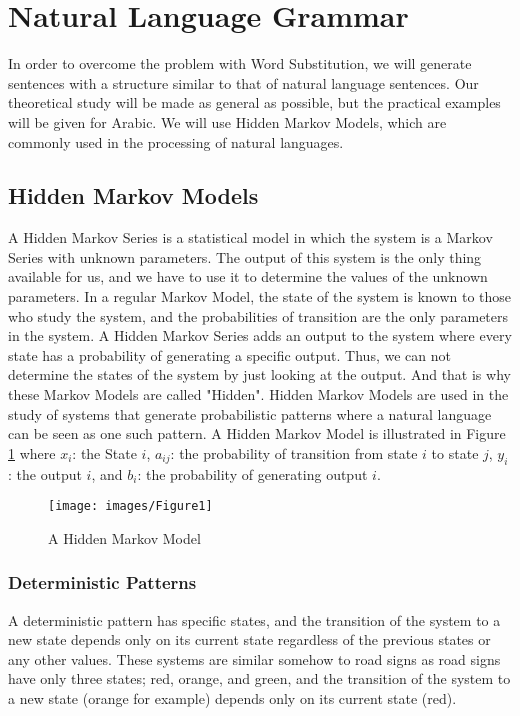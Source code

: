\documentclass{acm_proc_article-sp}
\begin{document}
\section{Natural Language Grammar}\label{Natural-Language-Grammar}
In order to overcome the problem with Word Substitution, we will generate sentences with a structure similar to that of natural language sentences. Our theoretical study will be made as general as possible, but the practical examples will be given for Arabic. We will use Hidden Markov Models, which are commonly used in the processing of natural languages.

\subsection{Hidden Markov Models}\label{Hidden-Markov-Models}
A Hidden Markov Series \cite{Rabiner1990} is a statistical model in which the system is a Markov Series with unknown parameters. The output of this system is the only thing available for us, and we have to use it to determine the values of the unknown parameters. In a regular Markov Model, the state of the system is known to those who study the system, and the probabilities of transition are the only parameters in the system. A Hidden Markov Series adds an output to the system where every state has a probability of generating a specific output. Thus, we can not determine the states of the system by just looking at the output. And that is why these Markov Models are called "Hidden". Hidden Markov Models are used in the study of systems that generate probabilistic patterns where a natural language can be seen as one such pattern. A Hidden Markov Model is illustrated in Figure \ref{A-Hidden-Markov-Model} where $x_{i}$: the State $i$, $a_{ij}$: the probability of transition from state $i$ to state $j$, $y_{i}$: the output $i$, and $b_{i}$: the probability of generating output $i$.

\begin{figure}
  \centering
  \texttt{[image: images/Figure1]}
  \caption{A Hidden Markov Model}\label{A-Hidden-Markov-Model}
\end{figure}

\subsubsection{Deterministic Patterns}\label{Deterministic-Patterns}
A deterministic pattern has specific states, and the transition of the system to a new state depends only on its current state regardless of the previous states or any other values. These systems are similar somehow to road signs as road signs have only three states; red, orange, and green, and the transition of the system to a new state (orange for example) depends only on its current state (red).
\end{document}
